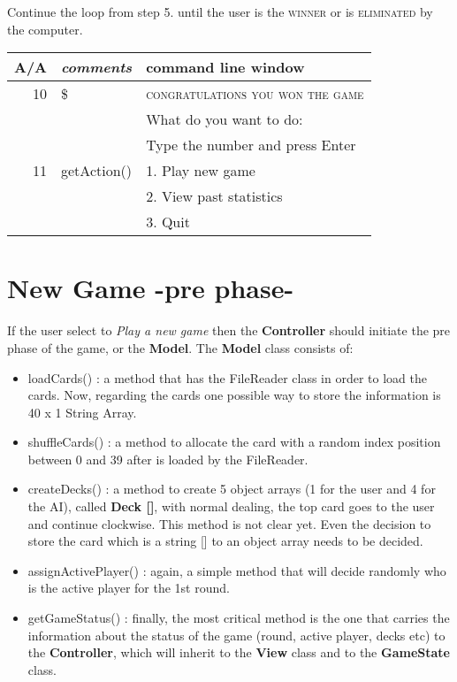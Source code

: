 \documentclass[a4paper, 12pt]{article}
\begin{document}
Continue the loop from step 5. until the user is the \textsc{winner} or is \textsc{eliminated} by the computer.\\

\begin{tabular}{r | l l}
A/A&\textit{comments} & \textbf{command line window}\\ \hline
10& \$& \textsc{congratulations you won the game}\\ \hline
&&What do you want to do:\\&&Type the number and press Enter\\
11&getAction()& 1. Play new game\\&&2. View past statistics\\&&3. Quit\\
\hline
\end{tabular}
\section{New Game -pre phase-}
If the user select to \textit{Play a new game} then the \textbf{Controller} should initiate the pre phase of the game, or the \textbf{Model}. The \textbf{Model} class consists of:
\begin{itemize}
\item loadCards() : a method that has the FileReader class in order to load the cards. Now, regarding the cards one possible way to store the information is 40 x 1 String Array.
\item shuffleCards() : a method to allocate the card with a random index position between 0 and 39 after is loaded by the FileReader.
\item createDecks() : a method to create 5 object arrays (1 for the user and 4 for the AI), called \textbf{Deck []}, with normal dealing, the top card goes to the user and continue clockwise. This method is not clear yet. Even the decision to store the card which is a string [] to an object array needs to be decided.
\item assignActivePlayer() : again, a simple method that will decide randomly who is the active player for the 1st round.
\item getGameStatus() : finally, the most critical method is the one that carries the information about the status of the game (round, active player, decks etc) to the \textbf{Controller}, which will inherit to the \textbf{View} class and to the \textbf{GameState} class. 
\end{itemize}
\end{document}
